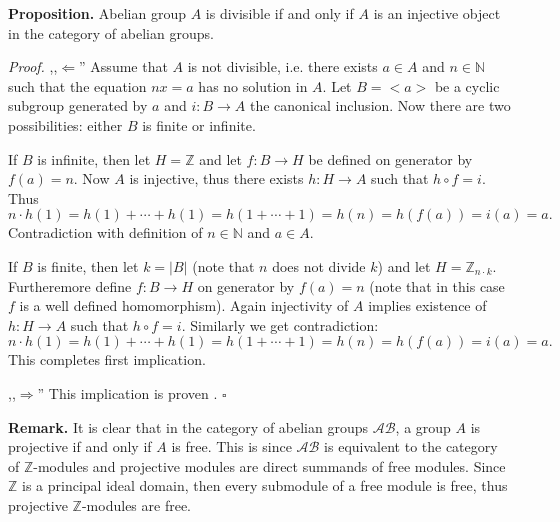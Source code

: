\documentclass[12pt]{article}
\begin{document}
\textbf{Proposition.} Abelian group $A$ is divisible if and only if $A$ is an injective object in the category of abelian groups.

\textit{Proof.} ,,$\Leftarrow$'' Assume that $A$ is not divisible, i.e. there exists $a\in A$ and $n\in\mathbb{N}$ such that the equation $nx=a$ has no solution in $A$. Let $B=<a>$ be a cyclic subgroup generated by $a$ and $i:B\to A$ the canonical inclusion. Now there are two possibilities: either $B$ is finite or infinite.

If $B$ is infinite, then let $H=\mathbb{Z}$ and let $f:B\to H$ be defined on generator by $f(a)=n$. Now $A$ is injective, thus there exists $h:H\to A$ such that $h\circ f=i$. Thus $$n\cdot h(1)=h(1)+\cdots +h(1)=h(1+\cdots +1)=h(n)=h(f(a))=i(a)=a.$$
Contradiction with definition of $n\in\mathbb{N}$ and $a\in A$.

If $B$ is finite, then let $k=|B|$ (note that $n$ does not divide $k$) and let $H=\mathbb{Z}_{n\cdot k}$. Furtheremore define $f:B\to H$ on generator by $f(a)=n$ (note that in this case $f$ is a well defined homomorphism). Again injectivity of $A$ implies existence of $h:H\to A$ such that $h\circ f=i$. Similarly we get contradiction:
$$n\cdot h(1)=h(1)+\cdots +h(1)=h(1+\cdots +1)=h(n)=h(f(a))=i(a)=a.$$
This completes first implication.

,,$\Rightarrow$'' This implication is proven . $\square$

\textbf{Remark.} It is clear that in the category of abelian groups $\mathcal{AB}$, a group $A$ is projective if and only if $A$ is free. This is since $\mathcal{AB}$ is equivalent to the category of $\mathbb{Z}$-modules and projective modules are direct summands of free modules. Since $\mathbb{Z}$ is a principal ideal domain, then every submodule of a free module is free, thus projective $\mathbb{Z}$-modules are free.
\end{document}
